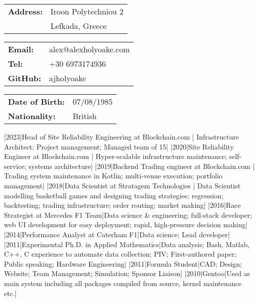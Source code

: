 \documentclass[a4paper,10pt]{article}
\begin{document}
\small
\smallskip
\vspace*{0.0cm}

{\begin{tabular}{ll}
\textbf{Address:} & Iroon Polytechniou 2 \\\
 & Lefkada, Greece\\
\end{tabular}}
{\begin{tabular}{ll}
\textbf{Email:} & alex@alexholyoake.com\\
   \textbf{Tel:} & +30 6973174936\\
   \textbf{GitHub:} & ajholyoake \\
\end{tabular}}
{\begin{tabular}{ll}
\textbf{Date of Birth:} & 07/08/1985 \\
\textbf{Nationality:} & British \\
\end{tabular}}

\normalsize 
\begin{cvsection}
   |2023|Head of Site Reliability Engineering at Blockchain.com | Infrastructure Architect; Project management; Managed team of 15|
   \R 2019|2020|Site Reliability Engineer at Blockchain.com | Hyper-scalable infrastructure maintenance; self-service; systems architecture|
   \R 2018|2019|Backend Trading engineer at Blockchain.com | Trading system maintenance in Kotlin; multi-venue execution; portfolio management|
   \R 2017|2018|Data Scientist at Stratagem Technologies | Data Scientist modelling basketball games and designing trading strategies; regression; backtesting; trading infrastructure; order routing; market making|
   \R 2014|2016|Race Strategist at Mercedes F1 Team|Data science \& engineering; full-stack developer; web UI development for easy deployment; rapid, high-pressure decision making|
   \R 2012|2014|Performance Analyst at Caterham F1|Data science; Lead developer|
   \R 2007|2011|Experimental Ph.D. in Applied Mathematics|Data analysis;
   Bash, Matlab, C++, C experience to automate data collection; PIV;
   First-authored paper; Public speaking; Hardware Engineering|
   |2011|Formula Student|CAD; Design; Website; Team Management; Simulation; Sponsor Liaison|
   \R 2005|2010|Gentoo|Used as main system including all packages compiled from
   source, kernel maintenance etc.|
\end{cvsection}


\end{document}
